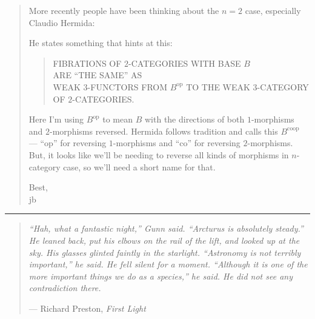\documentclass{article}
\def\tightlist{}
\renewcommand{\texttt}[1]{%
  \begingroup
  \ttfamily
  \begingroup\lccode`~=`/\lowercase{\endgroup\def~}{/\discretionary{}{}{}}%
  \begingroup\lccode`~=`[\lowercase{\endgroup\def~}{[\discretionary{}{}{}}%
  \begingroup\lccode`~=`.\lowercase{\endgroup\def~}{.\discretionary{}{}{}}%
  \catcode`/=\active\catcode`[=\active\catcode`.=\active
  \scantokens{#1\noexpand}%
  \endgroup
}
\begin{document}
\begin{quote}
More recently people have been thinking about the \(n = 2\) case,
especially Claudio Hermida:


He states something that hints at this:

\begin{quote}
FIBRATIONS OF \(2\)-CATEGORIES WITH BASE \(B\)\\
ARE ``THE SAME'' AS\\
WEAK \(3\)-FUNCTORS FROM \(B^{\mathrm{op}}\) TO THE WEAK \(3\)-CATEGORY
OF \(2\)-CATEGORIES.
\end{quote}

Here I'm using \(B^{\mathrm{op}}\) to mean \(B\) with the directions of
both \(1\)-morphisms and \(2\)-morphisms reversed. Hermida follows
tradition and calls this \(B^{\mathrm{coop}}\) --- ``\(\mathrm{op}\)''
for reversing \(1\)-morphisms and ``\(\mathrm{co}\)'' for reversing
\(2\)-morphisms. But, it looks like we'll be needing to reverse all
kinds of morphisms in \(n\)-category case, so we'll need a short name
for that.

Best,\\
jb
\end{quote}

\begin{center}\rule{0.5\linewidth}{0.5pt}\end{center}

\begin{quote}
\emph{``Hah, what a fantastic night,'' Gunn said. ``Arcturus is
absolutely steady.'' He leaned back, put his elbows on the rail of the
lift, and looked up at the sky. His glasses glinted faintly in the
starlight. ``Astronomy is not terribly important,'' he said. He fell
silent for a moment. ``Although it is one of the more important things
we do as a species,'' he said. He did not see any contradiction there.}

--- Richard Preston, \emph{First Light}
\end{quote}
\end{document}
